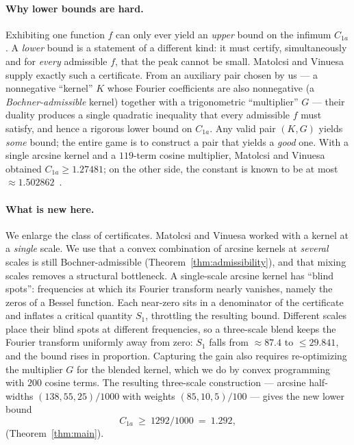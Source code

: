 \documentclass[11pt, letterpaper]{article}
\theoremstyle{paperplain}
\theoremstyle{paperdef}
\begin{document}
\paragraph{Why lower bounds are hard.}
Exhibiting one function $f$ can only ever yield an \emph{upper} bound
on the infimum $C_{1a}$.  A \emph{lower} bound is a statement of a
different kind: it must certify, simultaneously and for \emph{every}
admissible $f$, that the peak cannot be small.  Matolcsi and
Vinuesa~\cite{MV10} supply exactly such a certificate.  From an
auxiliary pair chosen by us --- a nonnegative ``kernel'' $K$ whose
Fourier coefficients are also nonnegative (a \emph{Bochner-admissible}
kernel) together with a trigonometric ``multiplier'' $G$ --- their
duality produces a single quadratic inequality that every admissible
$f$ must satisfy, and hence a rigorous lower bound on $C_{1a}$.  Any
valid pair $(K,G)$ yields \emph{some} bound; the entire game is to
construct a pair that yields a \emph{good} one.  With a single arcsine
kernel and a $119$-term cosine multiplier, Matolcsi and Vinuesa
obtained $C_{1a}\ge 1.27481$; on the other side, the constant is known
to be at most $\approx 1.502862$~\cite{AlphaEvolve26}.

\paragraph{What is new here.}
We enlarge the class of certificates.  Matolcsi and Vinuesa worked with
a kernel at a \emph{single} scale.  We use that a convex combination of
arcsine kernels at \emph{several} scales is still Bochner-admissible
(Theorem~\ref{thm:admissibility}), and that mixing scales removes a
structural bottleneck.  A single-scale arcsine kernel has ``blind
spots'': frequencies at which its Fourier transform nearly vanishes,
namely the zeros of a Bessel function.  Each near-zero sits in a
denominator of the certificate and inflates a critical quantity
$S_1$, throttling the resulting bound.  Different scales place their
blind spots at different frequencies, so a three-scale blend keeps the
Fourier transform uniformly away from zero: $S_1$ falls from
$\approx 87.4$ to $\le 29.841$, and the bound rises in proportion.
Capturing the gain also requires re-optimizing the multiplier $G$ for
the blended kernel, which we do by convex programming with $200$
cosine terms.  The resulting three-scale construction --- arcsine
half-widths $(138,55,25)/1000$ with weights $(85,10,5)/100$ --- gives
the new lower bound
\[
  C_{1a}\ \ge\ 1292/1000\ =\ 1.292,
\]
(Theorem~\ref{thm:main}).
\end{document}
